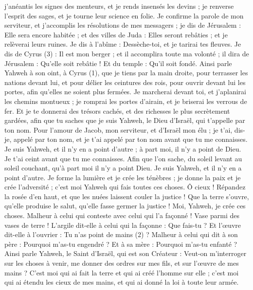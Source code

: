 \begin{multicols}{2}
{j’anéantis les signes des menteurs, et je rends insensés les devins ; je renverse l'esprit des sages, et je tourne leur science en folie.
Je confirme la parole de mon serviteur, et j’accomplis les résolutions de mes messagers ; je dis de Jérusalem : Elle sera encore habitée ; et des villes de Juda : Elles seront rebâties ; et je relèverai leurs ruines.
Je dis à l’abîme : Dessèche-toi, et je tarirai tes fleuves.
Je dis de Cyrus (3) : Il est mon berger ; et il accomplira toute ma volonté ; il dira de Jérusalem : Qu’elle soit rebâtie ! Et du temple : Qu’il soit fondé.
\VerseOne{}Ainsi parle Yahweh à son oint, à Cyrus (1),
que je tiens par la main droite, pour terrasser les nations devant lui, et pour délier les ceintures des rois, pour ouvrir devant lui les portes, afin qu’elles ne soient plus fermées.
Je marcherai devant toi, et j’aplanirai les chemins montueux ; je romprai les portes d'airain, et je briserai les verrous de fer. Et je te donnerai des trésors cachés, et des richesses le plus secrètement gardées, afin que tu saches que je suis Yahweh, le Dieu d'Israël, qui t'appelle par ton nom.
Pour l'amour de Jacob, mon serviteur, et d'Israël mon élu ; je t'ai, dis-je, appelé par ton nom, et je t'ai appelé par ton nom avant que tu me connaisses.
Je suis Yahweh, et il n'y en a point d'autre ; à part moi, il n'y a point de Dieu. Je t'ai ceint avant que tu me connaisses.
Afin que l’on sache, du soleil levant au soleil couchant, qu’à part moi il n'y a point Dieu. Je suis Yahweh, et il n'y en a point d'autre.
Je forme la lumière et je crée les ténèbres ; je donne la paix et je crée l'adversité ; c'est moi Yahweh qui fais toutes ces choses.
Ô cieux ! Répandez la rosée d'en haut, et que les nuées laissent couler la justice ! Que la terre s'ouvre, qu'elle produise le salut, qu’elle fasse germer la justice ! Moi, Yahweh, je crée ces choses.
Malheur à celui qui conteste avec celui qui l’a façonné ! Vase parmi des vases de terre ! L'argile dit-elle à celui qui la façonne : Que fais-tu ? Et l’œuvre dit-elle à l’ouvrier : Tu n'as point de mains (2) ?
Malheur à celui qui dit à son père : Pourquoi m’as-tu engendré ? Et à sa mère : Pourquoi m’as-tu enfanté ?
Ainsi parle Yahweh, le Saint d'Israël, qui est son Créateur : Veut-on m’interroger sur les choses à venir, me donner des ordres sur mes fils, et sur l’œuvre de mes mains ?
C'est moi qui ai fait la terre et qui ai créé l'homme sur elle ; c'est moi qui ai étendu les cieux de mes mains, et qui ai donné la loi à toute leur armée.
}
\end{multicols}
